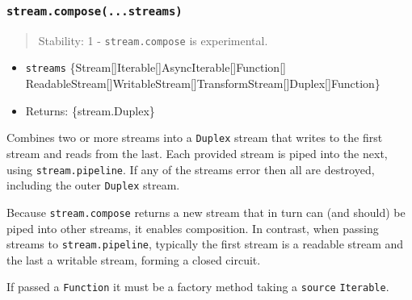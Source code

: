 \subsubsection{\texorpdfstring{\texttt{stream.compose(...streams)}}{stream.compose(...streams)}}\label{stream.compose...streams}

\begin{quote}
Stability: 1 - \texttt{stream.compose} is experimental.
\end{quote}

\begin{itemize}
\tightlist
\item
  \texttt{streams}
  \{Stream{[}{]}\textbar Iterable{[}{]}\textbar AsyncIterable{[}{]}\textbar Function{[}{]}\textbar{}
  ReadableStream{[}{]}\textbar WritableStream{[}{]}\textbar TransformStream{[}{]}\textbar Duplex{[}{]}\textbar Function\}
\item
  Returns: \{stream.Duplex\}
\end{itemize}

Combines two or more streams into a \texttt{Duplex} stream that writes
to the first stream and reads from the last. Each provided stream is
piped into the next, using \texttt{stream.pipeline}. If any of the
streams error then all are destroyed, including the outer
\texttt{Duplex} stream.

Because \texttt{stream.compose} returns a new stream that in turn can
(and should) be piped into other streams, it enables composition. In
contrast, when passing streams to \texttt{stream.pipeline}, typically
the first stream is a readable stream and the last a writable stream,
forming a closed circuit.

If passed a \texttt{Function} it must be a factory method taking a
\texttt{source} \texttt{Iterable}.

